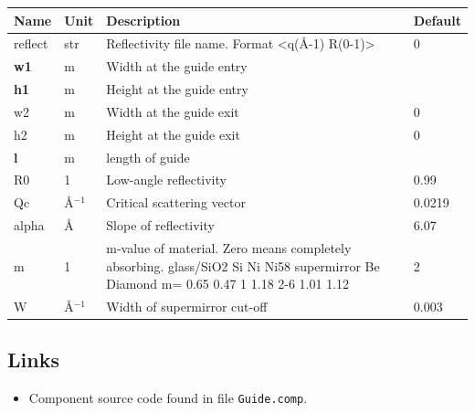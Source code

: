 \begin{longtable}{p{}p{}p{}p{}}
\toprule
\textbf{Name} & \textbf{Unit} & \textbf{Description} & \textbf{Default} \\
\midrule
\endhead
reflect & str & Reflectivity file name. Format \textless{}q(\AA{}-1) R(0-1)\textgreater{} & 0 \\
\textbf{w1} & m & Width at the guide entry &  \\
\textbf{h1} & m & Height at the guide entry &  \\
w2 & m & Width at the guide exit & 0 \\
h2 & m & Height at the guide exit & 0 \\
\textbf{l} & m & length of guide &  \\
R0 & 1 & Low-angle reflectivity & 0.99 \\
Qc & \AA{}$^{-1}$ & Critical scattering vector & 0.0219 \\
alpha & \AA{} & Slope of reflectivity & 6.07 \\
m & 1 & m-value of material. Zero means completely absorbing. glass/SiO2 Si Ni Ni58 supermirror Be Diamond m=  0.65 0.47 1 1.18 2-6 1.01 1.12 & 2 \\
W & \AA{}$^{-1}$ & Width of supermirror cut-off & 0.003 \\
\bottomrule
\end{longtable}

\subsection*{Links}
\begin{itemize}
  \item Component source code found in file \texttt{Guide.comp}.
\end{itemize}
